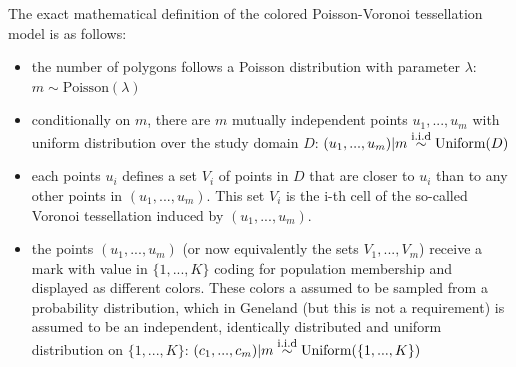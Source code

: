 \documentclass[a4paper,10pt]{article}
\begin{document}
The exact mathematical definition of the colored Poisson-Voronoi tessellation model is as follows:
\begin{itemize}
\item the number of polygons follows a Poisson distribution with parameter $\lambda$: $m \sim \mbox{Poisson}(\lambda)$
\item conditionally on $m$, there are $m$ mutually independent points $u_1,...,u_m$ with uniform distribution over the study domain $D$:
$(u_1,...,u_m) |m \stackrel{\mbox{\footnotesize i.i.d}}{\sim} \mbox{Uniform}(D)$ 
\item each points $u_i$ defines a set $V_i$ of points in $D$ that are closer to $u_i$ than to any other points in $(u_1,...,u_m)$. 
This set $V_i$ is the i-th cell of the so-called Voronoi tessellation induced by $(u_1,...,u_m)$.
\item the points $(u_1,...,u_m)$ (or now equivalently the sets $V_1,...,V_m$) receive a mark with value in $\{1,...,K\}$ 
coding for population membership and displayed as different colors. These colors a assumed to be sampled from a probability distribution, 
which in {\sc Geneland} (but this is not a requirement) is assumed to be an independent, identically 
distributed and uniform distribution on $\{1,...,K\}$: 
$(c_1,...,c_m) |m \stackrel{\mbox{\footnotesize i.i.d}}{\sim} \mbox{Uniform}(\{1,...,K\})$ 
\end{itemize}
\end{document}
